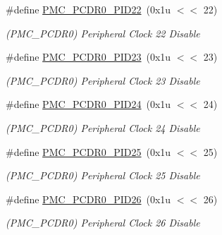 \begin{DoxyCompactItemize}
\mbox{\label{group__SAMV71__PMC_ga0adbf36c7daec359873b705fb066c366}} 
\#define \mbox{\hyperlink{group__SAMV71__PMC_ga0adbf36c7daec359873b705fb066c366}{P\+M\+C\+\_\+\+P\+C\+D\+R0\+\_\+\+P\+I\+D22}}~(0x1u $<$$<$ 22)
\begin{DoxyCompactList}\small\item\em (P\+M\+C\+\_\+\+P\+C\+D\+R0) Peripheral Clock 22 Disable \end{DoxyCompactList}\item 
\mbox{\label{group__SAMV71__PMC_gad2563764739c10422a7051bee751da88}} 
\#define \mbox{\hyperlink{group__SAMV71__PMC_gad2563764739c10422a7051bee751da88}{P\+M\+C\+\_\+\+P\+C\+D\+R0\+\_\+\+P\+I\+D23}}~(0x1u $<$$<$ 23)
\begin{DoxyCompactList}\small\item\em (P\+M\+C\+\_\+\+P\+C\+D\+R0) Peripheral Clock 23 Disable \end{DoxyCompactList}\item 
\mbox{\label{group__SAMV71__PMC_ga3e3e3730708d08656a1d6b2c35a96970}} 
\#define \mbox{\hyperlink{group__SAMV71__PMC_ga3e3e3730708d08656a1d6b2c35a96970}{P\+M\+C\+\_\+\+P\+C\+D\+R0\+\_\+\+P\+I\+D24}}~(0x1u $<$$<$ 24)
\begin{DoxyCompactList}\small\item\em (P\+M\+C\+\_\+\+P\+C\+D\+R0) Peripheral Clock 24 Disable \end{DoxyCompactList}\item 
\mbox{\label{group__SAMV71__PMC_ga5388a9602d3a894175478b7b06e71d76}} 
\#define \mbox{\hyperlink{group__SAMV71__PMC_ga5388a9602d3a894175478b7b06e71d76}{P\+M\+C\+\_\+\+P\+C\+D\+R0\+\_\+\+P\+I\+D25}}~(0x1u $<$$<$ 25)
\begin{DoxyCompactList}\small\item\em (P\+M\+C\+\_\+\+P\+C\+D\+R0) Peripheral Clock 25 Disable \end{DoxyCompactList}\item 
\mbox{\label{group__SAMV71__PMC_gad50968f0a06aa7996f16c45b27677d0f}} 
\#define \mbox{\hyperlink{group__SAMV71__PMC_gad50968f0a06aa7996f16c45b27677d0f}{P\+M\+C\+\_\+\+P\+C\+D\+R0\+\_\+\+P\+I\+D26}}~(0x1u $<$$<$ 26)
\begin{DoxyCompactList}\small\item\em (P\+M\+C\+\_\+\+P\+C\+D\+R0) Peripheral Clock 26 Disable \end{DoxyCompactList}\item 
$$
\end{DoxyCompactItemize}
